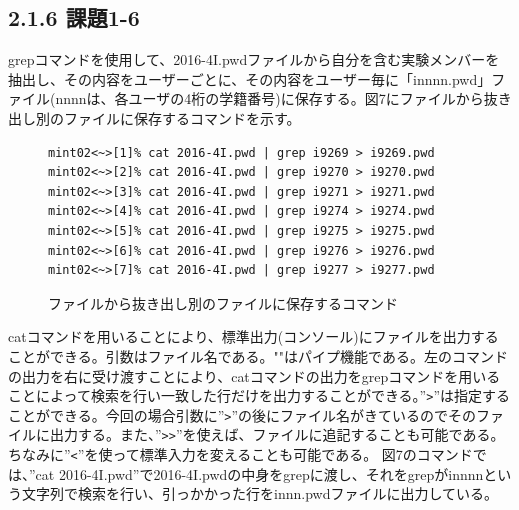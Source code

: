 \documentclass[12pt]{jreport}
\begin{document}
            \subsection*{2.1.6 課題1-6}
                grepコマンドを使用して、2016-4I.pwdファイルから自分を含む実験メンバーを抽出し、その内容をユーザーごとに、その内容をユーザー毎に「innnn.pwd」ファイル(nnnnは、各ユーザの4桁の学籍番号)に保存する。図7にファイルから抜き出し別のファイルに保存するコマンドを示す。
                \begin{figure}[H]
                    \begin{center}
                        \begin{screen}
                            \begin{verbatim}
mint02<~>[1]% cat 2016-4I.pwd | grep i9269 > i9269.pwd
mint02<~>[2]% cat 2016-4I.pwd | grep i9270 > i9270.pwd
mint02<~>[3]% cat 2016-4I.pwd | grep i9271 > i9271.pwd
mint02<~>[4]% cat 2016-4I.pwd | grep i9274 > i9274.pwd
mint02<~>[5]% cat 2016-4I.pwd | grep i9275 > i9275.pwd
mint02<~>[6]% cat 2016-4I.pwd | grep i9276 > i9276.pwd
mint02<~>[7]% cat 2016-4I.pwd | grep i9277 > i9277.pwd
                            \end{verbatim}
                        \end{screen}
                        \caption{ファイルから抜き出し別のファイルに保存するコマンド}
                        \label{7}
                    \end{center}
                \end{figure}
                catコマンドを用いることにより、標準出力(コンソール)にファイルを出力することができる。引数はファイル名である。"\textbar"はパイプ機能である。左のコマンドの出力を右に受け渡すことにより、catコマンドの出力をgrepコマンドを用いることによって検索を行い一致した行だけを出力することができる。''\verb|>|''は指定することができる。今回の場合引数に''\verb|>|''の後にファイル名がきているのでそのファイルに出力する。また、''\verb|>|\verb|>|''を使えば、ファイルに追記することも可能である。ちなみに''\verb|<|''を使って標準入力を変えることも可能である。
                図7のコマンドでは、''cat 2016-4I.pwd''で2016-4I.pwdの中身をgrepに渡し、それをgrepがinnnnという文字列で検索を行い、引っかかった行をinnn.pwdファイルに出力している。
\end{document}
